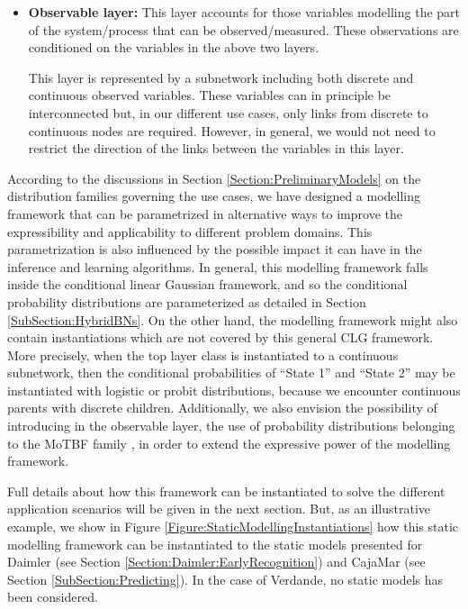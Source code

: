 \begin{itemize}
\item \textbf{Observable layer:} This layer accounts for those variables modelling the part of the system/process that can be observed/measured. These observations are conditioned on the variables in the above two layers. 

This layer is represented by a subnetwork including both discrete and continuous observed variables. These variables can in principle be interconnected but, in our different use cases, only links from discrete to continuous nodes are required. However, in general, we would not need to restrict the direction of the links between the variables in this layer.

\end{itemize} 


According to the discussions in Section \ref{Section:PreliminaryModels} on the distribution families governing the use
cases, we have designed a modelling framework that can be parametrized in alternative ways to improve the expressibility
and applicability to different problem domains. This parametrization is also influenced by the possible impact it can
have in the inference and learning algorithms. In general, this modelling framework falls inside the conditional linear
Gaussian framework, and so the conditional probability distributions are parameterized as detailed in Section
\ref{SubSection:HybridBNs}. On the other hand, the modelling framework might also contain instantiations which are not
covered by this general CLG framework. More precisely, when the top layer class is instantiated to  a continuous
subnetwork, then the conditional probabilities of ``State 1'' and ``State 2'' may be instantiated with logistic or
probit distributions, because we encounter continuous parents with discrete children. Additionally, we also envision the
possibility of introducing in the observable layer, the use of probability distributions belonging to the MoTBF family
\cite{Langseth12}, in order to extend the expressive power of the modelling framework.

Full details about how this framework can be instantiated to solve the different application scenarios will be given in the next section. But, as an illustrative example, we show in Figure \ref{Figure:StaticModellingInstantiations} how this static modelling framework can be instantiated to the static models presented for Daimler (see Section \ref{Section:Daimler:EarlyRecognition}) and CajaMar (see Section \ref{SubSection:Predicting}). In the case of Verdande, no static models has been considered. 


